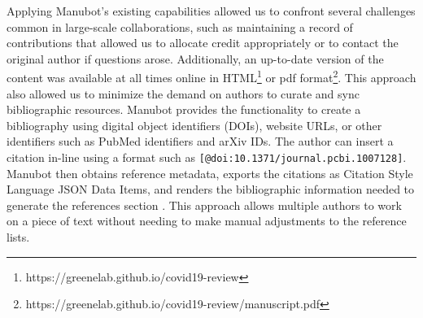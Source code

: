 \documentclass[twocolumn]{ceurart}
\begin{document}
Applying Manubot's existing capabilities allowed us to confront several challenges common in large-scale collaborations, such as maintaining a record of contributions that allowed us to allocate credit appropriately or to contact the original author if questions arose.
Additionally, an up-to-date version of the content was available at all times online in HTML\footnote{https://greenelab.github.io/covid19-review} or pdf format\footnote{https://greenelab.github.io/covid19-review/manuscript.pdf}.
This approach also allowed us to minimize the demand on authors to curate and sync bibliographic resources.
Manubot provides the functionality to create a bibliography using digital object identifiers (DOIs), website URLs, or other identifiers such as PubMed identifiers and arXiv IDs.
The author can insert a citation in-line using a format such as \texttt{{[}@doi:10.1371/journal.pcbi.1007128{]}}.
Manubot then obtains reference metadata, exports the citations as Citation Style Language JSON Data Items, and renders the bibliographic information needed to generate the references section \citep{YuJbg3zO}.
This approach allows multiple authors to work on a piece of text without needing to make manual adjustments to the reference lists.
\end{document}

